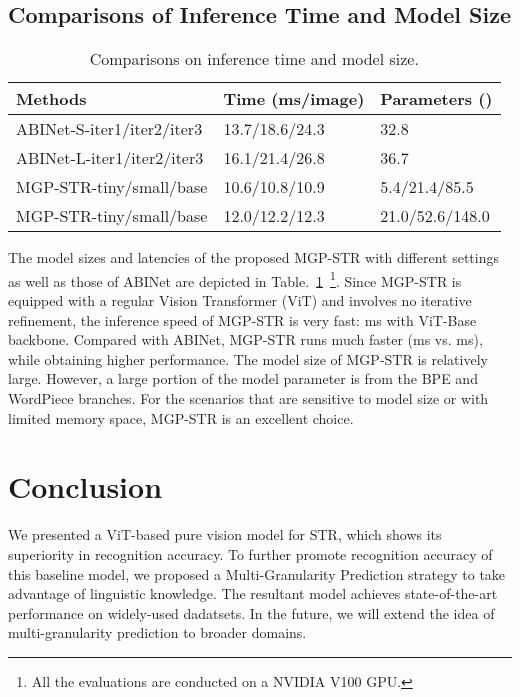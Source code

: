 \documentclass[runningheads]{llncs}
\begin{document}
\subsection{Comparisons of Inference Time and Model Size} 

\begin{table}[h]\centering
\setlength{\tabcolsep}{5pt}
\caption{Comparisons on inference time and model size.}
\label{tab:speed}
\begin{tabular}{|l|l|l|}
\hline
{Methods}  & {Time} (ms/image) & Parameters ()  \\
\hline
ABINet-S-iter1/iter2/iter3 & 13.7/18.6/24.3 & 32.8 \\
\hline
ABINet-L-iter1/iter2/iter3 & 16.1/21.4/26.8 & 36.7 \\
\hline
MGP-STR-tiny/small/base  & 10.6/10.8/10.9  & 5.4/21.4/85.5 \\
\hline
MGP-STR-tiny/small/base  & 12.0/12.2/12.3  & 21.0/52.6/148.0 \\
\hline
\end{tabular}
\end{table}

The model sizes and latencies of the proposed MGP-STR with different settings as well as those of ABINet are depicted in Table.~\ref{tab:speed}~\footnote{All the evaluations are conducted on a NVIDIA V100 GPU.}. Since MGP-STR is equipped with a regular Vision Transformer (ViT) and involves no iterative refinement, the inference speed of MGP-STR is very fast: ms with ViT-Base backbone. Compared with ABINet, MGP-STR runs much faster (ms vs. ms), while obtaining higher performance. The model size of MGP-STR is relatively large. However, a large portion of the model parameter is from the BPE and WordPiece branches. For the scenarios that are sensitive to model size or with limited memory space, MGP-STR is an excellent choice.

\section{Conclusion}

We presented a ViT-based pure vision model for STR, which shows its superiority in recognition accuracy. To further promote recognition accuracy of this baseline model, we proposed a Multi-Granularity Prediction strategy to take advantage of linguistic knowledge. The resultant model achieves state-of-the-art performance on widely-used dadatsets. In the future, we will extend the idea of multi-granularity prediction to broader domains.
\end{document}
